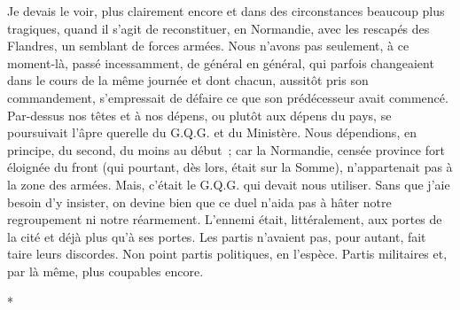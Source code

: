 \documentclass[french,twoside]{book} %
\begin{document}
Je devais le voir, plus clairement encore et dans des circonstances beaucoup plus tragiques, quand il s’agit de reconstituer, en Normandie, avec les rescapés des Flandres, un semblant de forces armées. Nous n’avons pas seulement, à ce moment-là, passé incessamment, de général en général, qui parfois changeaient dans le cours de la même journée et dont chacun, aussitôt pris son commandement, s’empressait de défaire ce que son prédécesseur avait commencé. Par-dessus nos têtes et à nos dépens, ou plutôt aux dépens du pays, se poursuivait l’âpre querelle du G.Q.G. et du Ministère. Nous dépendions, en principe, du second, du moins au début ; car la   Normandie, censée province fort éloignée du front (qui pourtant, dès lors, était sur la Somme), n’appartenait pas à la zone des armées. Mais, c’était le G.Q.G. qui devait nous utiliser. Sans que j’aie besoin d’y insister, on devine bien que ce duel n’aida pas à hâter notre regroupement ni notre réarmement. L’ennemi était, littéralement, aux portes de la cité et déjà plus qu’à ses portes. Les partis n’avaient pas, pour autant, fait taire leurs discordes. Non point partis politiques, en l’espèce. Partis militaires et, par là même, plus coupables encore.\par

\begin{center}
*\par
\end{center}
\end{document}
